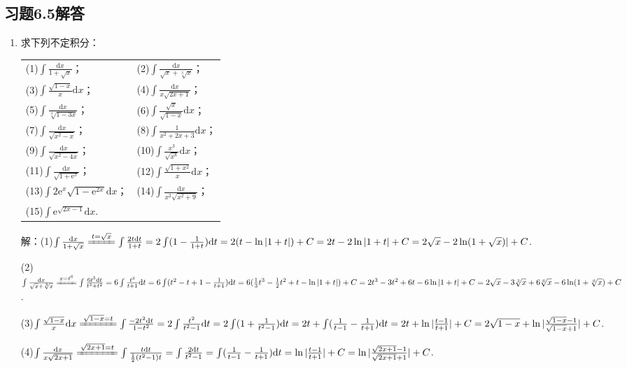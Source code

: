\documentclass[12pt,UTF8]{ctexart}
\begin{document}
\subsection{习题6.5解答}
\begin{enumerate}
\item[]求下列不定积分：
\newline
\begin{tabular}{ll}
(1)$\int\frac{\mathrm dx}{1+\sqrt x}$；&(2)$\int\frac{\mathrm dx}{\sqrt x+\sqrt[3]x}$；\\
(3)$\int\frac{\sqrt{1-x}}x\mathrm dx$；&(4)$\int\frac{\mathrm dx}{x\sqrt{2x+1}}$；\\
(5)$\int\frac{\mathrm dx}{\sqrt[3]{1-3x}}$；&(6)$\int\frac{\sqrt x}{\sqrt{1-x}}\mathrm dx$；\\
(7)$\int\frac{\mathrm dx}{\sqrt{x^2-x}}$；&(8)$\int\frac1{x^2+2x+3}\mathrm dx$；\\
(9)$\int\frac{\mathrm dx}{\sqrt{x^2-4x}}$；&(10)$\int\frac{x^3}{\sqrt{x^8}}\mathrm dx$；\\
(11)$\int\frac{\mathrm dx}{\sqrt{1+\mathrm e^x}}$；&(12)$\int\frac{\sqrt{1+x^2}}x\mathrm dx$；\\
(13)$\int2\mathrm e^x\sqrt{1-\mathrm e^{2x}}\mathrm dx$；&(14)$\int\frac{\mathrm dx}{x^2\sqrt{x^2+9}}$；\\
(15)$\int\mathrm e^{\sqrt{2x-1}}\mathrm dx$.
\end{tabular}

解：(1)$\int\frac{\mathrm dx}{1+\sqrt x}\xlongequal{t=\sqrt x}\int\frac{2t\mathrm dt}{1+t}=2\int(1-\frac1{1+t})\mathrm dt=2(t-\ln|1+t|)+C=2t-2\ln|1+t|+C\\
=2\sqrt x-2\ln(1+\sqrt x)|+C$.

(2)$\int\frac{\mathrm dx}{\sqrt x+\sqrt[3]x}\xlongequal{x=t^6}\int\frac{6t^5\mathrm dt}{t^3+t^2}=6\int\frac{t^3}{t+1}\mathrm dt=6\int(t^2-t+1-\frac1{t+1})\mathrm dt\\
=6(\frac13t^3-\frac12t^2+t-\ln|1+t|)+C=2t^3-3t^2+6t-6\ln|1+t|+C\\
=2\sqrt x-3\sqrt[3]x+6\sqrt[6]x-6\ln(1+\sqrt[6]x)+C$.

(3)$\int\frac{\sqrt{1-x}}x\mathrm dx\xlongequal{\sqrt{1-x}=t}\int\frac{-2t^2\mathrm dt}{1-t^2}=2\int\frac{t^2}{t^2-1}\mathrm dt=2\int(1+\frac1{t^2-1})\mathrm dt=2t+\int(\frac1{t-1}-\frac1{t+1})\mathrm dt\\
=2t+\ln|\frac{t-1}{t+1}|+C=2\sqrt{1-x}+\ln|\frac{\sqrt{1-x}-1}{\sqrt{1-x}+1}|+C$.

(4)$\int\frac{\mathrm dx}{x\sqrt{2x+1}}\xlongequal{\sqrt{2x+1}=t}\int\frac{t\mathrm dt}{\frac12(t^2-1)t}=\int\frac{2\mathrm dt}{t^2-1}=\int(\frac1{t-1}-\frac1{t+1})\mathrm dt=\ln|\frac{t-1}{t+1}|+C\\
=\ln|\frac{\sqrt{2x+1}-1}{\sqrt{2x+1}+1}|+C$.


\end{enumerate}
\end{document}
